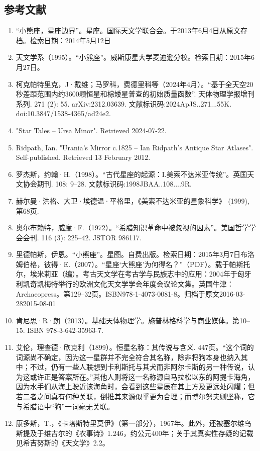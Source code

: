 \subsection{参考文献}
\begin{enumerate}
\item “小熊座，星座边界”。星座。国际天文学联合会。于2013年6月4日从原文存档。检索日期：2014年5月12日
\item 天文学系（1995）。“小熊座”。威斯康星大学麦迪逊分校。检索日期：2015年6月27日。
\item 柯克帕特里克，J·戴维；马罗科，费德里科等（2024年4月）。“基于全天空20秒差距范围内约3600颗恒星和棕矮星普查的初始质量函数”. 天体物理学报增刊系列. 271 (2): 55. arXiv:2312.03639. 文献标识码:2024ApJS..271...55K. doi:10.3847/1538-4365/ad24e2.
\item "Star Tales – Ursa Minor". Retrieved 2024-07-22.
\item Ridpath, Ian. "Urania's Mirror c.1825 – Ian Ridpath's Antique Star Atlases". Self-published. Retrieved 13 February 2012.
\item 罗杰斯，约翰·H.（1998）。“古代星座的起源：I.美索不达米亚传统”。英国天文协会期刊. 108: 9–28. 文献标识码:1998JBAA..108....9R.
\item 赫尔曼·洪格、大卫·埃德温·平格里，《美索不达米亚的星象科学》 (1999), 第68页.
\item 奥尔布赖特，威廉·F.（1972）。“希腊知识革命中被忽视的因素”。美国哲学学会会刊. 116 (3): 225–42. JSTOR 986117.
\item 里德帕斯，伊恩。“小熊座”。星图。自费出版。检索日期：2015年3月7日布洛姆伯格，彼得·E.（2007）。“星座‘大熊座’为何得名？”（PDF）。载于帕斯托尔，埃米莉亚（编）。考古天文学在考古学与民族志中的应用：2004年于匈牙利凯奇凯梅特举行的欧洲文化天文学学会年度会议论文集。英国牛津：Archaeopress。第129–32页。ISBN978-1-4073-0081-8。归档于原文2016-03-282015-08-01
\item 肯尼思·R·朗（2013）。基础天体物理学。施普林格科学与商业媒体。第10–15. ISBN 978-3-642-35963-7.
\item 艾伦，理查德·欣克利（1899）。恒星名称：其传说与含义. 447页。“这个词的词源尚不确定，因为这一星群并不完全符合其名称，除非将狗本身也纳入其中；不过，仍有一些人联想到卡利斯托与其犬而非阿尔卡斯的另一种传说，认为这或许正是答案所在。”其他人则将这一名称源自马拉松以东的阿提卡海角，因为水手们从海上驶近该海角时，会看到这些星辰在其上方及更远处闪耀；但若二者之间真有何种关联，倒推其来源似乎更为合理；而博尔努夫则坚称，它与希腊语中“狗”一词毫无关联。
\item 康多斯，T.，《卡塔斯特里莫伊》（第一部分），1967年。此外，还被塞尔维乌斯提及于维吉尔的《农事诗》1.246，约公元400年；关于其真实性存疑的记载见希吉努斯的《天文学》2.2。

\end{enumerate}

